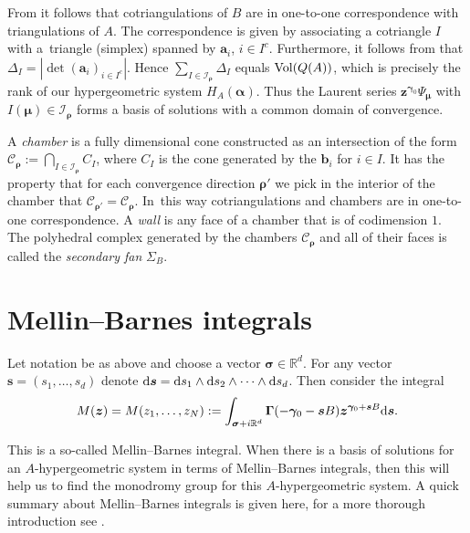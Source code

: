 \documentclass[pdftex]{sigma}
\numberwithin{equation}{section}
\begin{document}
From \cite[Section 5.4]{DRS10} it follows that cotriangulations of $B$ are
in one-to-one correspondence with triangulations of $A$. The correspondence is given
by associating a cotriangle $I$ with a~triangle (simplex) spanned by $\bm{a}_i$, $i\in I^c$.
Furthermore, it follows from \cite[Lemma 14.2]{Beu11} that $\Delta_I=|\det(\bm{a}_i)_{i\in I^c}|$.
Hence $\sum_{I\in\mathcal{I}_{\bm\rho}}\Delta_I$ equals ${\rm Vol}(Q(A))$, which is
precisely the rank of our hypergeometric system $H_A(\bm\alpha)$. Thus the Laurent
series $\bm{z}^{\bm\gamma_0}\Psi_{\bm\mu}$ with $I(\bm\mu)\in\mathcal{I}_{\bm\rho}$
forms a basis of solutions with a common domain of convergence.

\begin{Definition}
\label{def-chamber-wall-fan}
A {\it chamber} is a fully dimensional cone constructed as an intersection of the form $\mathcal{C}_{\bm\rho} := \bigcap_{I \in \mathcal{I}_{\bm\rho}} C_I$, where $C_I$ is the cone generated by the $\bm{b}_i$ for $i \in I$. It has the property that for each convergence direction $\bm\rho'$ we pick in the interior of the chamber that $\mathcal{C}_{\bm\rho'} = \mathcal{C}_{\bm\rho}$. In~this way cotriangulations and chambers are in one-to-one correspondence. A {\it wall} is any face of a chamber that is of codimension $1$. The polyhedral complex generated by the chambers $\mathcal{C}_{\bm\rho}$ and all of their faces is called the {\it secondary fan} $\Sigma_B$.
\end{Definition}

\section{Mellin--Barnes integrals}

Let notation be as above and choose a vector $\bm{\sigma} \in \mathbb{R}^d$. For any vector $\bm{s} = (s_1,\dots,s_d)$ denote ${\rm d} \bm{s}= {\rm d} s_1 \wedge {\rm d} s_2 \wedge \dots \wedge {\rm d} s_d$. Then consider the integral
\begin{gather*}
M(\bm{z}) = M(z_1,\dots,z_N) := \int_{\bm{\sigma} + i\mathbb{R}^d} \bm{\Gamma}(-\bm{\gamma}_0-\bm{s}B)\bm{z}^{\bm{\gamma}_0 + \bm{s}B} {\rm d} \bm{s}.
\end{gather*}

This is a so-called Mellin--Barnes integral. When there is a basis of solutions
for an $A$-hypergeometric system in terms of Mellin--Barnes integrals, then this will help us to find the monodromy group for this $A$-hypergeometric system. A quick summary about Mellin--Barnes integrals is given here, for a more thorough introduction see \cite{Beu13}.
\end{document}
